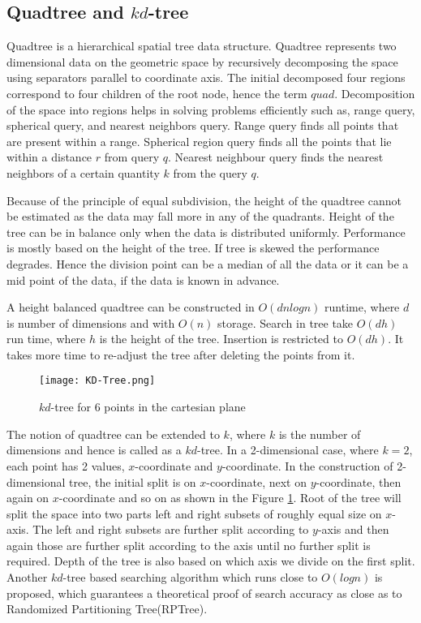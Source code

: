 \documentclass[runningheads]{llncs}
\begin{document}
\subsection{Quadtree and $kd$-tree}
\label{subsec:3}
Quadtree\cite{R.A.Finkel} is a hierarchical spatial tree data structure. Quadtree represents two dimensional data on the geometric space by recursively decomposing the space using separators parallel to coordinate axis. The initial decomposed four regions correspond to four children of the root node, hence the term $quad$. Decomposition of the space into regions helps in solving problems efficiently such as, range query, spherical query, and nearest neighbors query. Range query finds all points that are present within a range.  Spherical region query finds all the points that lie within a distance $r$ from query $q$. Nearest neighbour query finds the nearest neighbors of a certain quantity $k$ from the query $q$.

Because of the principle of equal subdivision, the height of the quadtree cannot be estimated as the data may fall more in any of the quadrants. Height of the tree can be in balance only when the data is distributed uniformly. Performance is mostly based on the height of the tree. If tree is skewed the performance degrades. Hence the division point can be a median of all the data or it can be a mid point of the data\cite{Songrit Maneewongvatana}, if the data is known in advance.  

A height balanced quadtree can be constructed in $O(dnlogn)$ runtime, where $d$ is number of dimensions and with $O(n)$ storage. Search in tree take $O(dh)$ run time, where $h$ is the height of the tree. Insertion is restricted to $O(dh)$. It takes more time to re-adjust the tree after deleting the points from it. 

\begin{figure}[!hbt]
	\centering
	\texttt{[image: KD-Tree.png]}
	\caption{$kd$-tree for 6 points in the cartesian plane}
	\label{fig:1}       %
\end{figure}

The notion of quadtree can be extended to $k$, where $k$ is the number of dimensions and hence is called as a $kd$-tree\cite{Spatial KDTree}. In a 2-dimensional case, where $k=2$, each point has 2 values, $x$-coordinate and $y$-coordinate. In the construction of 2-dimensional tree, the initial split is on $x$-coordinate, next on $y$-coordinate, then again on $x$-coordinate and so on as shown in the Figure \ref{fig:1}. Root of the tree will split the space into two parts left and right subsets of roughly equal size on $x$-axis. The left and right subsets are further split according to $y$-axis and then again those are further split according to the axis until no further split is required. Depth of the tree is also based on which axis we divide on the first split. Another $kd$-tree based searching algorithm\cite{Parikshit Ram} which runs close to $O(logn)$ is proposed, which guarantees a theoretical proof of search accuracy as close as to Randomized Partitioning Tree(RPTree).
\end{document}
